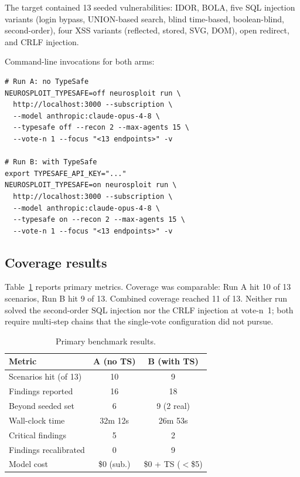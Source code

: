 \documentclass[conference]{IEEEtran}
\begin{document}
The target contained 13 seeded vulnerabilities: IDOR, BOLA, five SQL injection variants (login bypass, UNION-based search, blind time-based, boolean-blind, second-order), four XSS variants (reflected, stored, SVG, DOM), open redirect, and CRLF injection.

Command-line invocations for both arms:

\begin{lstlisting}[language={},float=!h,caption={CLI invocations for the controlled benchmark.},label={lst:cli}]
# Run A: no TypeSafe
NEUROSPLOIT_TYPESAFE=off neurosploit run \
  http://localhost:3000 --subscription \
  --model anthropic:claude-opus-4-8 \
  --typesafe off --recon 2 --max-agents 15 \
  --vote-n 1 --focus "<13 endpoints>" -v

# Run B: with TypeSafe
export TYPESAFE_API_KEY="..."
NEUROSPLOIT_TYPESAFE=on neurosploit run \
  http://localhost:3000 --subscription \
  --model anthropic:claude-opus-4-8 \
  --typesafe on --recon 2 --max-agents 15 \
  --vote-n 1 --focus "<13 endpoints>" -v
\end{lstlisting}

\FloatBarrier

\subsection{Coverage results}

Table~\ref{tab:results} reports primary metrics. Coverage was comparable: Run A hit 10 of 13 scenarios, Run B hit 9 of 13. Combined coverage reached 11 of 13. Neither run solved the second-order SQL injection nor the CRLF injection at vote-n~1; both require multi-step chains that the single-vote configuration did not pursue.

\begin{table}[h]
\centering
\caption{Primary benchmark results.}
\label{tab:results}
\small
\begin{tabular}{@{}lcc@{}}
\toprule
\textbf{Metric} & \textbf{A (no TS)} & \textbf{B (with TS)} \\
\midrule
Scenarios hit (of 13) & 10 & 9 \\
Findings reported & 16 & 18 \\
Beyond seeded set & 6 & 9 (2 real) \\
Wall-clock time & 32m 12s & 26m 53s \\
Critical findings & 5 & 2 \\
Findings recalibrated & 0 & 9 \\
Model cost & \$0 (sub.) & \$0 + TS ($<$\$5) \\
\bottomrule
\end{tabular}
\end{table}
\end{document}
